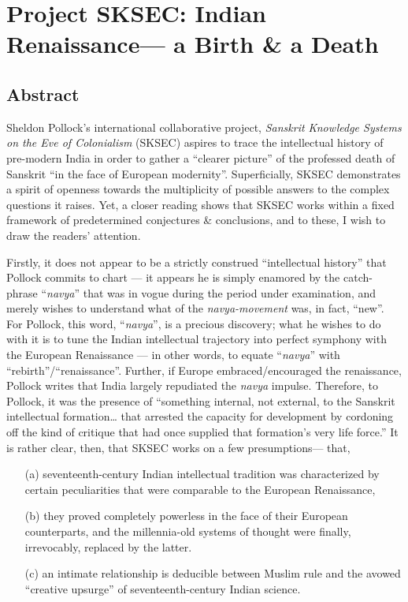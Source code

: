 \chapter{Project SKSEC: Indian Renaissance— a Birth \& a Death}\label{chapter4}

\section*{Abstract}

Sheldon Pollock’s international collaborative project, {\sl Sanskrit Knowledge Systems on the Eve of Colonialism} (SKSEC) aspires to trace the intellectual history of pre-modern India in order to gather a “clearer picture” of the professed death of Sanskrit “in the face of European modernity”. Superficially, SKSEC demonstrates a spirit of openness towards the multiplicity of possible answers to the complex questions it raises. Yet, a closer reading shows that SKSEC works within a fixed framework of predetermined conjectures \& conclusions, and to these, I wish to draw the readers’ attention. 

Firstly, it does not appear to be a strictly construed “intellectual history” that Pollock commits to chart — it appears he is simply enamored by the catch-phrase “{\sl navya}” that was in vogue during the period under examination, and merely wishes to understand what of the {\sl navya-movement} was, in fact, “new”. For Pollock, this word, “{\sl navya}”, is a precious discovery; what he wishes to do with it is to tune the Indian intellectual trajectory into perfect symphony with the European Renaissance — in other words, to equate “{\sl navya}” with “rebirth”/“renaissance”. Further, if Europe embraced/encouraged the renaissance, Pollock writes that India largely repudiated the {\sl navya} impulse. Therefore, to Pollock, it was the presence of “something internal, not external, to the Sanskrit intellectual formation… that arrested the capacity for development by cordoning off the kind of critique that had once supplied that formation’s very life force.”
It is rather clear, then, that SKSEC works on a few presumptions— that,  
\begin{itemize}
\item[(a)] seventeenth-century Indian intellectual tradition was characterized by certain peculiarities that were comparable to the European Renaissance,

\item[(b)] they proved completely powerless in the face of their European counterparts, and the millennia-old systems of thought were finally, irrevocably, replaced by the latter. 

\item[(c)] an intimate relationship is deducible between Muslim rule and the avowed “creative upsurge” of seventeenth-century Indian science.
\end{itemize}

